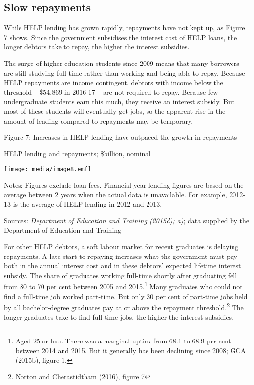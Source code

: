 \documentclass[]{book}
\begin{document}
\subsection{Slow repayments }\label{slow-repayments}

While HELP lending has grown rapidly, repayments have not kept up, as Figure 7 shows. Since the government subsidises the interest cost of HELP loans, the longer debtors take to repay, the higher the interest subsidies.

The surge of higher education students since 2009 means that many borrowers are still studying full-time rather than working and being able to repay. Because HELP repayments are income contingent, debtors with income below the threshold -- \$54,869 in 2016-17 -- are not required to repay. Because few undergraduate students earn this much, they receive an interest subsidy. But most of these students will eventually get jobs, so the apparent rise in the amount of lending compared to repayments may be temporary.

\protect\hypertarget{_Ref332988694}{}{}Figure 7: Increases in HELP lending have outpaced the growth in repayments

HELP lending and repayments; \$billion, nominal

\texttt{[image: media/image8.emf]}

Notes: Figures exclude loan fees. Financial year lending figures are based on the average between 2 years when the actual data is unavailable. For example, 2012-13 is the average of HELP lending in 2012 and 2013.

Sources: \emph{\protect\hyperlink{_ENREF_27}{Department of Education and Training (2015d}); \protect\hyperlink{_ENREF_24}{a})}; data supplied by the Department of Education and Training

For other HELP debtors, a soft labour market for recent graduates is delaying repayments. A late start to repaying increases what the government must pay both in the annual interest cost and in these debtors' expected lifetime interest subsidy. The share of graduates working full-time shortly after graduating fell from 80 to 70 per cent between 2005 and 2015.\footnote{Aged 25 or less. There was a marginal uptick from 68.1 to 68.9 per cent between 2014 and 2015. But it generally has been declining since 2008; GCA (2015b), figure 1.} Many graduates who could not find a full-time job worked part-time. But only 30 per cent of part-time jobs held by all bachelor-degree graduates pay at or above the repayment threshold.\footnote{Norton and Cherastidtham (2016), figure 7} The longer graduates take to find full-time jobs, the higher the interest subsidies.
\end{document}
